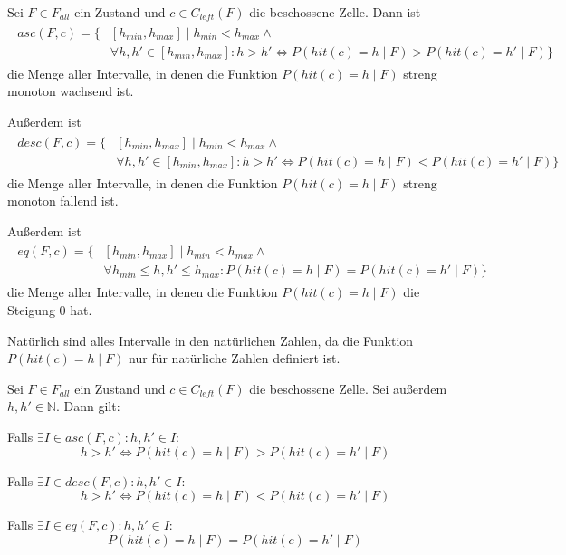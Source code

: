 \documentclass[a4paper,12pt]{llncs}
\numberwithin{equation}{section}
\begin{document}
\begin{definition}
Sei $F\in F_{all}$ ein Zustand und $c \in C_{left}(F)$ die beschossene Zelle.
Dann ist
\begin{align}
\begin{split}
asc(F, c)=\{&[h_{min}, h_{max}] \mid h_{min} < h_{max} \wedge \\ 
&\forall h,h' \in [h_{min}, h_{max}]  \colon h > h' \Leftrightarrow P(hit(c)=h \mid F) > P(hit(c)=h' \mid F)\}
\nonumber
\end{split}
\end{align}
die Menge aller Intervalle, in denen die Funktion $P(hit(c)=h \mid F)$ streng monoton wachsend ist.

Außerdem ist
\begin{align}
\begin{split}
desc(F, c)=\{&[h_{min}, h_{max}] \mid h_{min} < h_{max} \wedge \\ 
&\forall h,h' \in [h_{min}, h_{max}]  \colon h > h' \Leftrightarrow P(hit(c)=h \mid F) < P(hit(c)=h' \mid F)\}
\nonumber
\end{split}
\end{align}
die Menge aller Intervalle, in denen die Funktion $P(hit(c)=h \mid F)$ streng monoton fallend ist.

Außerdem ist
\begin{align}
\begin{split}
eq(F, c)=\{&[h_{min}, h_{max}] \mid h_{min} < h_{max} \wedge \\ 
&\forall h_{min} \leq h,h' \leq h_{max} \colon P(hit(c)=h \mid F) = P(hit(c)=h' \mid F)\}
\nonumber
\end{split}
\end{align}
die Menge aller Intervalle, in denen die Funktion $P(hit(c)=h \mid F)$ die Steigung 0 hat.

Natürlich sind alles Intervalle in den natürlichen Zahlen, da die Funktion $P(hit(c)=h \mid F)$ nur für natürliche Zahlen definiert ist.
\end{definition}

\begin{lemma}
Sei $F\in F_{all}$ ein Zustand und $c \in C_{left}(F)$ die beschossene Zelle.
Sei außerdem $h,h' \in \mathbb{N}$.
Dann gilt:

Falls $\exists I \in asc(F, c) \colon h,h' \in I$:
\[
h > h' \Leftrightarrow P(hit(c)=h \mid F) > P(hit(c)=h' \mid F)
\]

Falls $\exists I \in desc(F, c) \colon h,h' \in I$:
\[
h > h' \Leftrightarrow P(hit(c)=h \mid F) < P(hit(c)=h' \mid F)
\]

Falls $\exists I \in eq(F, c) \colon h,h' \in I$:
\[
P(hit(c)=h \mid F) = P(hit(c)=h' \mid F)
\]

\end{lemma}
\end{document}
